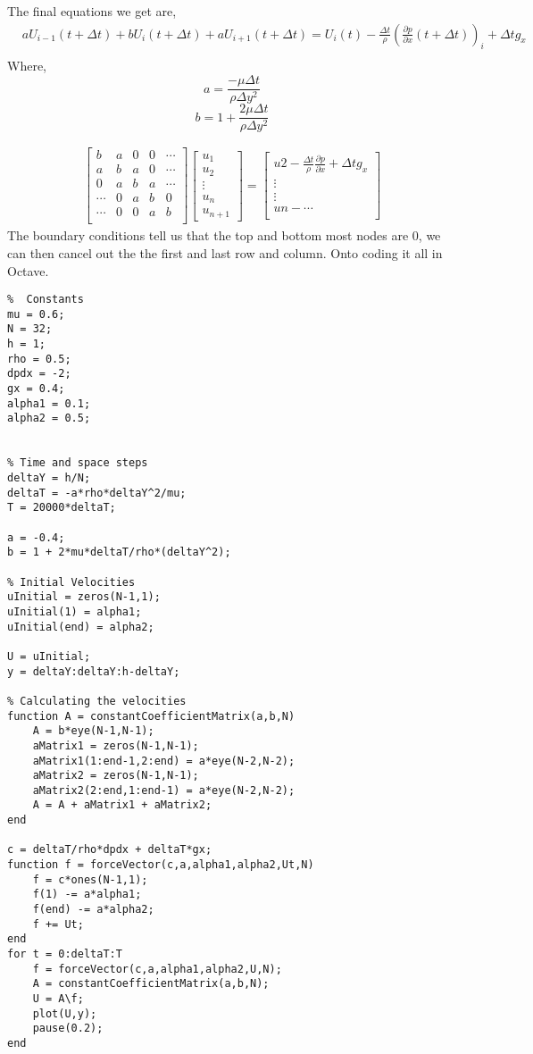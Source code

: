 \documentclass{report}
\begin{document}
The final equations we get are,
\begin{align*}
	&a U _{i-1}(t + \Delta t) + b U_i(t+ \Delta t) + a U_{i+1}(t + \Delta t) = U_{i}(t) - \frac{\Delta t}{\rho}(\frac{\partial p}{\partial x}(t + \Delta t))_i + \Delta t g_x \\
\end{align*}
Where, 
\[ 
	a = \frac{-\mu \Delta t}{\rho \Delta y^2}
\]
\[
	b = 1 + \frac{2\mu \Delta t}{\rho \Delta y^2}
\]

\begin{align*}
	\begin{bmatrix}
		b  & a & 0 & 0 & \cdots \\
		a & b & a & 0 & \cdots \\
		0 & a & b & a & \cdots \\  
		\cdots & 0 & a & b & 0\\
		\cdots & 0 & 0 & a & b \\
	\end{bmatrix}
	\begin{bmatrix}
		u_1 \\
		u_2 \\
		\vdots \\
		u_n \\
		u_{n+1}
	\end{bmatrix}
	= 
	\begin{bmatrix}
		u2 - \frac{\Delta t}{\rho}\frac{\partial p}{\partial x} + \Delta t g_x \\
		\vdots \\
		\vdots \\
		un - \cdots \\
	\end{bmatrix}
\end{align*}
The boundary conditions tell us that the top and bottom most nodes are 0, we can then cancel out the the first and last row and column.
Onto coding it all in Octave.
\begin{lstlisting}
%  Constants
mu = 0.6;
N = 32;
h = 1;
rho = 0.5;
dpdx = -2;
gx = 0.4;
alpha1 = 0.1;
alpha2 = 0.5;


% Time and space steps
deltaY = h/N;
deltaT = -a*rho*deltaY^2/mu;
T = 20000*deltaT;

a = -0.4;
b = 1 + 2*mu*deltaT/rho*(deltaY^2);

% Initial Velocities
uInitial = zeros(N-1,1);
uInitial(1) = alpha1;
uInitial(end) = alpha2;

U = uInitial;
y = deltaY:deltaY:h-deltaY;

% Calculating the velocities
function A = constantCoefficientMatrix(a,b,N)
	A = b*eye(N-1,N-1);
	aMatrix1 = zeros(N-1,N-1);
	aMatrix1(1:end-1,2:end) = a*eye(N-2,N-2);
	aMatrix2 = zeros(N-1,N-1);
	aMatrix2(2:end,1:end-1) = a*eye(N-2,N-2);
	A = A + aMatrix1 + aMatrix2;
end

c = deltaT/rho*dpdx + deltaT*gx;
function f = forceVector(c,a,alpha1,alpha2,Ut,N)
	f = c*ones(N-1,1);
	f(1) -= a*alpha1;
	f(end) -= a*alpha2;
	f += Ut;
end
for t = 0:deltaT:T
	f = forceVector(c,a,alpha1,alpha2,U,N);
	A = constantCoefficientMatrix(a,b,N);
	U = A\f;
	plot(U,y);
	pause(0.2);
end
\end{lstlisting}
\end{document}
